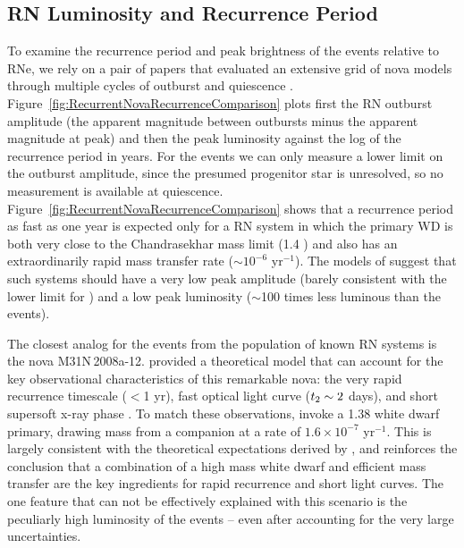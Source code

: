\subsection{RN Luminosity and Recurrence Period}\label{sec:RNLuminosityRecurrence}

To examine the recurrence period and peak brightness of the \spock
events relative to RNe, we rely on a pair of papers that evaluated an
extensive grid of nova models through multiple cycles of outburst and
quiescence \citep{Prialnik:1995,Yaron:2005}.
Figure~\ref{fig:RecurrentNovaRecurrenceComparison} plots first the RN
outburst amplitude (the apparent magnitude between outbursts minus the
apparent magnitude at peak) and then the peak luminosity against the
log of the recurrence period in years.
For the \spock events we can only measure a lower limit on the
outburst amplitude, since the presumed progenitor star is unresolved,
so no measurement is available at
quiescence. Figure~\ref{fig:RecurrentNovaRecurrenceComparison} shows
that a recurrence period as fast as one year is expected only for a RN
system in which the primary WD is both very close to the Chandrasekhar
mass limit (1.4 \Msun) and also has an extraordinarily rapid mass
transfer rate ($\sim10^{-6}$ \Msun yr$^{-1}$).  The models of
\citet{Yaron:2005} suggest that such systems should have a very low
peak amplitude (barely consistent with the lower limit for \spock) and
a low peak luminosity ($\sim$100 times less luminous than the \spock
events).

The closest analog for the \spock events from the population of known
RN systems is the nova M31N\,2008a-12.  \citet{Kato:2015} provided a
theoretical model that can account for the key observational
characteristics of this remarkable nova: the very rapid recurrence
timescale ($<$1 yr), fast optical light curve ($\t2\sim2$ days), and
short supersoft x-ray phase \citep[6-18 days after optical
  outburst][]{Henze:2015a}.  To match these observations,
\citeauthor{Kato:2015} invoke a 1.38 \Msun white dwarf primary,
drawing mass from a companion at a rate of $1.6\times10^{-7}$ \Msun
yr$^{-1}$.  This is largely consistent with the theoretical
expectations derived by \citet{Yaron:2005}, and reinforces the
conclusion that a combination of a high mass white dwarf and efficient
mass transfer are the key ingredients for rapid recurrence and short
light curves. The one feature that can not be effectively explained
with this scenario is the peculiarly high luminosity of the \spock
events -- even after accounting for the very large uncertainties. 
